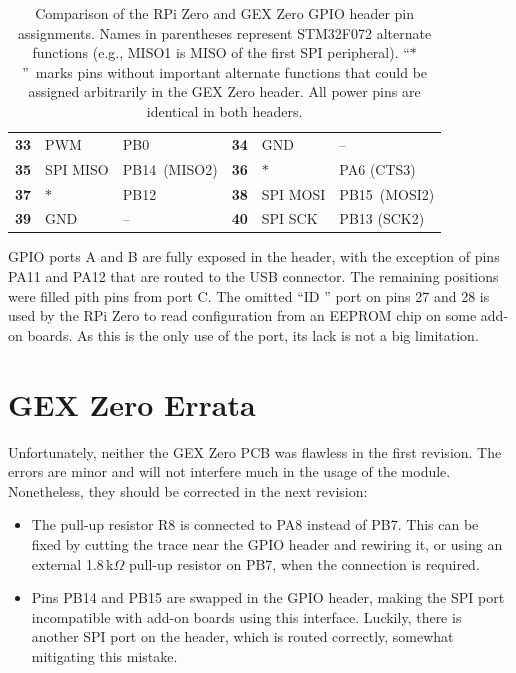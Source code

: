 \begin{table}
\begin{tabularx}{\textwidth}{W{.1\textwidth}XX|W{.1\textwidth}XX}
		\midrule
		\textbf{33} & PWM & PB0 
		& \textbf{34} & \leavevmode\color{blue}GND & -- \\
		\textbf{35} & SPI MISO & PB14~(MISO2)
		& \textbf{36} &  $\ast$ & PA6 (CTS3) \\
		\textbf{37} & $\ast$ & PB12
		& \textbf{38} & SPI MOSI & PB15~(MOSI2)\\
		\textbf{39} & \leavevmode\color{blue}GND & -- 
		& \textbf{40} & SPI SCK & PB13 (SCK2)\\
		\bottomrule 
	\end{tabularx}
	\caption[Comparison of the RPI Zero and GEX Zero GPIO headers]{\label{tbl:gz_rpi_compare}
		Comparison of the RPi Zero and GEX Zero GPIO header pin assignments. Names in parentheses represent STM32F072 alternate functions (e.g., MISO1 is MISO of the first SPI peripheral). ``$\ast$''~marks pins without important alternate functions that could be assigned arbitrarily in the GEX Zero header. All power pins are identical in both headers.
	}
\end{table}

\gls{GPIO} ports A and B are fully exposed in the header, with the exception of pins PA11 and PA12 that are routed to the USB connector. The remaining positions were filled pith pins from port C. The omitted ``ID \IIC'' port on pins 27 and 28 is used by the RPi Zero to read configuration from an EEPROM chip on some add-on boards. As this is the only use of the \IIC port, its lack is not a big limitation.

\section{GEX Zero Errata}

Unfortunately, neither the GEX Zero \gls{PCB} was flawless in the first revision. The errors are minor and will not interfere much in the usage of the module. Nonetheless, they should be corrected in the next revision:

\begin{itemize}[itemsep=0pt]
	\item The \IIC pull-up resistor R8 is connected to PA8 instead of PB7. This can be fixed by cutting the trace near the \gls{GPIO} header and rewiring it, or using an external 1.8\,k$\Omega$ pull-up resistor on PB7, when the \IIC connection is required.
	\item Pins PB14 and PB15 are swapped in the \gls{GPIO} header, making the SPI port incompatible with add-on boards using this interface. Luckily, there is another SPI port on the header, which is routed correctly, somewhat mitigating this mistake.
\end{itemize}

